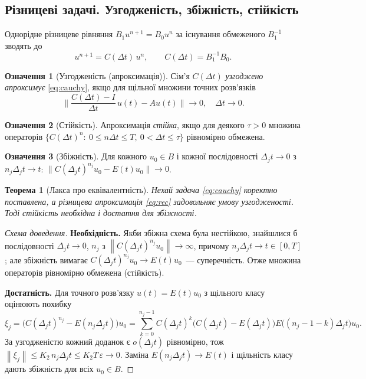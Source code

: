 \documentclass[12pt,a4paper]{article}
\theoremstyle{definition}
\newtheorem{ozn}{Означення}[section]
\theoremstyle{plain}
\newtheorem*{teorema*}{Теорема}
\newcommand{\norm}[1]{\left\lVert #1 \right\rVert}
\begin{document}
\subsection{Різницеві задачі. Узгодженість, збіжність, стійкість}
Однорідне різницеве рівняння $B_1 u^{n+1}=B_0 u^n$ за існування
обмеженого $B_1^{-1}$ зводять до
\begin{equation}
  u^{n+1}=C(\Delta t)\,u^n,\qquad C(\Delta t)=B_1^{-1}B_0 .
  \label{eq:rec}
\end{equation}
\begin{ozn}[Узгодженість (апроксимація)]
Сім'я $C(\Delta t)$ \emph{узгоджено апроксимує} \eqref{eq:cauchy}, якщо
для щільної множини точних розв'язків
\[
  \Big\|\frac{C(\Delta t)-I}{\Delta t}\,u(t)-Au(t)\Big\|\to0,
  \quad \Delta t\to0 .
\]
\end{ozn}
\begin{ozn}[Стійкість]
Апроксимація \emph{стійка}, якщо для деякого $\tau>0$ множина операторів
$\{C(\Delta t)^n:\ 0\le n\Delta t\le T,\ 0<\Delta t\le\tau\}$ рівномірно
обмежена.
\end{ozn}
\begin{ozn}[Збіжність]
Для кожного $u_0\in B$ і кожної послідовності $\Delta_j t\to0$ з
$n_j\Delta_j t\to t$:\quad
$\big\|C(\Delta_j t)^{n_j}u_0-E(t)u_0\big\|\to0$.
\end{ozn}

\begin{teorema*}[Лакса про еквівалентність]
Нехай задача \eqref{eq:cauchy} коректно поставлена, а різницева
апроксимація \eqref{eq:rec} задовольняє умову узгодженості. Тоді
\emph{стійкість необхідна і достатня для збіжності}.
\end{teorema*}
\begin{proof}[Схема доведення]
\textbf{Необхідність.} Якби збіжна схема була нестійкою, знайшлися б
послідовності $\Delta_j t\to0$, $n_j$ з $\norm{C(\Delta_j t)^{n_j}u_0}\to\infty$,
причому $n_j\Delta_j t\to t\in[0,T]$; але збіжність вимагає
$C(\Delta_j t)^{n_j}u_0\to E(t)u_0$~--- суперечність. Отже множина
операторів рівномірно обмежена (стійкість).

\noindent\textbf{Достатність.} Для точного розв'язку $u(t)=E(t)u_0$ з
щільного класу оцінюють похибку
\[
  \xi_j=\Big(C(\Delta_j t)^{n_j}-E(n_j\Delta_j t)\Big)u_0
   =\sum_{k=0}^{n_j-1}C(\Delta_j t)^{k}\big(C(\Delta_j t)-E(\Delta_j t)\big)
     E\big((n_j-1-k)\Delta_j t\big)u_0 .
\]
За узгодженістю кожний доданок є $o(\Delta_j t)$ рівномірно, тож
$\norm{\xi_j}\le K_2\,n_j\Delta_j t\le K_2 T\,\varepsilon\to0$. Заміна
$E(n_j\Delta_j t)\to E(t)$ і щільність класу дають збіжність для всіх
$u_0\in B$.
\end{proof}
\end{document}
